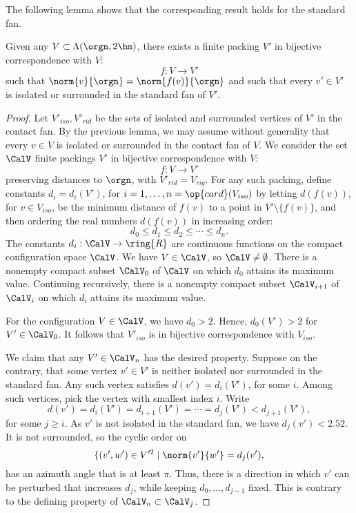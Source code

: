 The following lemma shows that the corresponding result
holds for the standard fan.

\begin{lemma}\label{lemma:surrounded}  
Given any $V\subset \Lambda(\orgn,2\hm)$,
there exists a finite packing $V'$ 
in bijective correspondence with $V$:
$$
f:V\to V'
$$
such that $\norm{v}{\orgn} = \norm{f(v)}{\orgn}$ and
such that every $v'\in V'$
is isolated or surrounded in the standard fan of $V'$.
\end{lemma}

\begin{proof}  
Let $V'_{iso},V'_{rid}$ be the
sets of isolated and surrounded vertices of $V'$ in the contact
fan.
By the previous lemma, we may assume
without generality that every $v\in V$ is isolated
or surrounded in the contact fan of $V$.    
We consider the set $\CalV$ finite
packings $V'$ in bijective correspondence with $V$:
$$
f:V\to V'
$$
preserving distances to $\orgn$, with $V'_{rid}=V_{rig}$.
For any such packing, define constants $d_i=d_i(V')$,
for $i=1,\ldots,n=\op{card}(V_{iso})$ by letting 
$d(f(v))$, for $v\in V_{iso}$, 
be the minimum distance of $f(v)$ to a point
in $V'\setminus \{f(v)\}$, and then ordering the real numbers $d(f(v))$ in increasing order:
$$
d_0 \le d_1 \le d_2 \le \cdots \le d_n.
$$
The constants $d_i:\CalV\to\ring{R}$ are continuous functions on the compact configuration space $\CalV$.
We have $V\in \CalV$, so $\CalV\ne\emptyset$.
There is a nonempty 
compact subset $\CalV_0$ of $\CalV$ on which
$d_0$ attains its maximum value. Continuing recursively,
there is a nonempty compact subset $\CalV_{i+1}$ of
$\CalV_{i}$ on which $d_i$ attains its maximum value.

For the configuration $V\in \CalV$, we have $d_0 >2$.
Hence, $d_0(V')>2$ for $V'\in\CalV_0$.  It follows
that $V'_{iso}$ is in bijective correspondence with
$V_{iso}$.

We claim that any $V'\in \CalV_n$ has the desired property.
Suppose on the contrary, that some vertex $v'\in V'$
is neither isolated nor surrounded in the standard fan.  
Any such vertex satisfies $d(v')=d_i(V')$, for some $i$.
Among such vertices, pick the vertex with smallest index
$i$.  Write 
$$
d(v') = d_i(V') = d_{i+1}(V') =\cdots= d_j(V') < d_{j+1}(V'),
$$
for some $j\ge i$.  As $v'$ is not isolated in the
standard fan, we have $d_j(v') < 2.52$.  It is not surrounded,
so the cyclic order on
$$
\{(v',w')\in V'^2 \mid \norm{v'}{w'} = d_j(v'),
$$
has an azimuth angle that is at least $\pi$.
Thus, there is a direction in which $v'$ can be perturbed
that increases $d_j$, while keeping $d_0,\ldots,d_{j-1}$
fixed.  This is contrary to the defining property of
$\CalV_n\subset\CalV_j$.
\end{proof}


